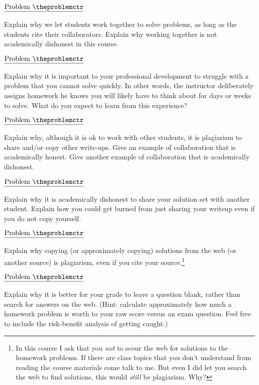\documentclass[11pt]{article}
\def\pp{\par\noindent}
\begin{document}
\bigskip\bigskip


\addtocounter{problemctr}{1}
\bigskip
\noindent
$\underline{\rm Problem\ \theproblemctr}$\pp 
%
Explain why we let students work together to solve problems, as long
as the students cite their collaborators. Explain why working together
is not academically dishonest in this course.

\addtocounter{problemctr}{1}
\bigskip
\noindent
$\underline{\rm Problem\ \theproblemctr}$\pp 
%
Explain why it is important to your professional development to
struggle with a problem that you cannot solve quickly. In other words,
the instructor deliberately assigns homework he knows you will likely
have to think about for days or weeks to solve. What do you expect to
learn from this experience?

\addtocounter{problemctr}{1}
\bigskip
\noindent
$\underline{\rm Problem\ \theproblemctr}$\pp 
%
Explain why, although it is ok to work with other students, it is
plagiarism to share and/or copy other write-ups.  Give an example of
collaboration that is academically honest. Give another example of
collaboration that is academically dishonest.

\addtocounter{problemctr}{1}
\bigskip
\noindent
$\underline{\rm Problem\ \theproblemctr}$\pp 
%
Explain why it is academically dishonest to share your solution set
with another student.  Explain how you could get burned from just
sharing your writeup even if you do not copy yourself.

\addtocounter{problemctr}{1}
\bigskip
\noindent
$\underline{\rm Problem\ \theproblemctr}$\pp Explain why copying (or
approximately copying) solutions from the web (or another source) is
plagiarism, even if you cite your source.\footnote{In this course I
  ask that you \emph{not} to scour the web for solutions to the
  homework problems. If there are class topics that you don't
  understand from reading the course materials come talk to me. But
  even I did let you search the web to find solutions, this would
  \emph{still} be plagiarism. Why? }
 
\addtocounter{problemctr}{1} \bigskip
\noindent
$\underline{\rm Problem\ \theproblemctr}$\pp 
%
Explain why it is better for your grade to leave a question blank,
rather than search for answers on the web.  (Hint: calculate
approximately how much a homework problem is worth to your raw score
versus an exam question. Feel free to include the risk-benefit
analysis of getting caught.)
\end{document}

